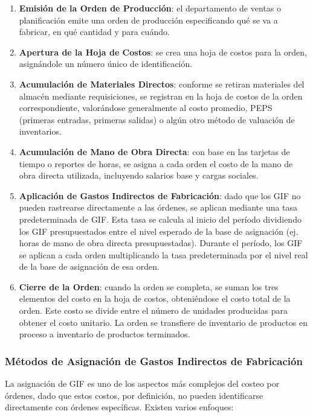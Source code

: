 \documentclass[
  stu,
  floatsintext,
  longtable,
  a4paper,
  nolmodern,
  notxfonts,
  notimes,
  12pt,
  colorlinks=true,linkcolor=blue,citecolor=blue,urlcolor=blue]{apa7}
\begin{document}
\begin{enumerate}
\def\labelenumi{\arabic{enumi}.}
\item
  \textbf{Emisión de la Orden de Producción}: el departamento de ventas
  o planificación emite una orden de producción especificando qué se va
  a fabricar, en qué cantidad y para cuándo.
\item
  \textbf{Apertura de la Hoja de Costos}: se crea una hoja de costos
  para la orden, asignándole un número único de identificación.
\item
  \textbf{Acumulación de Materiales Directos}: conforme se retiran
  materiales del almacén mediante requisiciones, se registran en la hoja
  de costos de la orden correspondiente, valorándose generalmente al
  costo promedio, PEPS (primeras entradas, primeras salidas) o algún
  otro método de valuación de inventarios.
\item
  \textbf{Acumulación de Mano de Obra Directa}: con base en las tarjetas
  de tiempo o reportes de horas, se asigna a cada orden el costo de la
  mano de obra directa utilizada, incluyendo salarios base y cargas
  sociales.
\item
  \textbf{Aplicación de Gastos Indirectos de Fabricación}: dado que los
  GIF no pueden rastrearse directamente a las órdenes, se aplican
  mediante una tasa predeterminada de GIF. Esta tasa se calcula al
  inicio del período dividiendo los GIF presupuestados entre el nivel
  esperado de la base de asignación (ej. horas de mano de obra directa
  presupuestadas). Durante el período, los GIF se aplican a cada orden
  multiplicando la tasa predeterminada por el nivel real de la base de
  asignación de esa orden.
\item
  \textbf{Cierre de la Orden}: cuando la orden se completa, se suman los
  tres elementos del costo en la hoja de costos, obteniéndose el costo
  total de la orden. Este costo se divide entre el número de unidades
  producidas para obtener el costo unitario. La orden se transfiere de
  inventario de productos en proceso a inventario de productos
  terminados.
\end{enumerate}

\subsubsection{Métodos de Asignación de Gastos Indirectos de
Fabricación}\label{muxe9todos-de-asignaciuxf3n-de-gastos-indirectos-de-fabricaciuxf3n}

La asignación de GIF es uno de los aspectos más complejos del costeo por
órdenes, dado que estos costos, por definición, no pueden identificarse
directamente con órdenes específicas. Existen varios enfoques:
\end{document}
